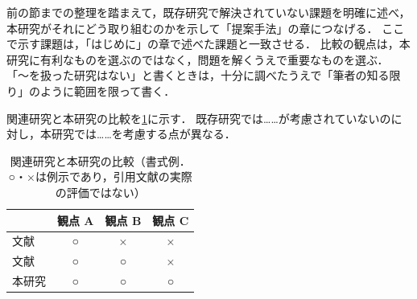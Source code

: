 \begin{writingnote}
前の節までの整理を踏まえて，既存研究で解決されていない課題を明確に述べ，本研究がそれにどう取り組むのかを示して「提案手法」の章につなげる．
ここで示す課題は，「はじめに」の章で述べた課題と一致させる．
比較の観点は，本研究に有利なものを選ぶのではなく，問題を解くうえで重要なものを選ぶ．
「〜を扱った研究はない」と書くときは，十分に調べたうえで「筆者の知る限り」のように範囲を限って書く．
\end{writingnote}

関連研究と本研究の比較を\cref{tab:comparison}に示す．
既存研究では……が考慮されていないのに対し，本研究では……を考慮する点が異なる．

\begin{table}[tbp]
  \centering
  \caption[関連研究と本研究の比較（書式例）]{関連研究と本研究の比較（書式例．○・×は例示であり，引用文献の実際の評価ではない）}
  \label{tab:comparison}
  \begin{tabular}{lccc}
    \toprule
    & 観点 A & 観点 B & 観点 C \\
    \midrule
    文献~\cite{dantzig1957discrete} & ○ & × & × \\
    文献~\cite{nishi2011}           & ○ & ○ & × \\
    本研究                           & ○ & ○ & ○ \\
    \bottomrule
  \end{tabular}
\end{table}
